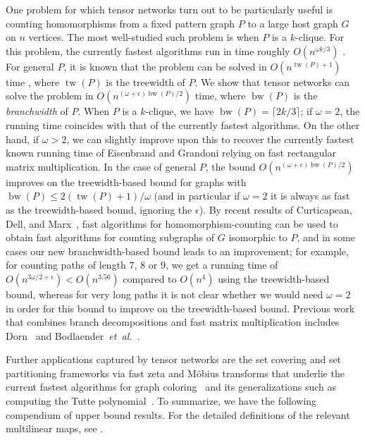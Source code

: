 \documentclass{toc}
\DeclareMathOperator{\bw}{bw}
\DeclareMathOperator{\tw}{tw}
\begin{document}
One problem for which tensor networks turn out to be particularly useful
is counting homomorphisms from a fixed pattern graph $P$ to
a large host graph $G$ on $n$ vertices.  The most well-studied such problem
is when $P$ is a $k$-clique.  For this problem, the currently fastest
algorithms run in time roughly $O(n^{\omega k/3})$
\cite{Nesetril1985,EisenbrandG2004}.  For general $P$, it is known
that the problem can be solved in $O(n^{\tw(P)+1})$ time
\cite{DiazST02}, where $\tw(P)$ is the treewidth of $P$.
We show that tensor networks can solve the problem in $O(n^{(\omega+\epsilon)
  \bw(P)/2})$ time, where $\bw(P)$ is the \emph{branchwidth} of $P$.
When $P$ is a $k$-clique, we have $\bw(P) = \lceil 2k/3\rceil$; if $\omega = 2$,
the running time coincides with that of the currently fastest algorithms.
On the other hand, if $\omega > 2$, we can slightly improve upon this to recover the
currently fastest known running time of
Eisenbrand and Grandoni \cite{EisenbrandG2004} relying on fast rectangular matrix multiplication.
In the case of general $P$, the bound $O(n^{(\omega+\epsilon) \bw(P)/2})$ improves
on the treewidth-based bound for graphs with $\bw(P) \le
2(\tw(P)+1)/\omega$ (and in particular if $\omega=2$ it is always as
fast as the treewidth-based bound, ignoring the $\epsilon$).  By
recent results of Curticapean, Dell, and Marx~\cite{CurticapeanDM2017},
fast algorithms for homomorphism-counting can be used to obtain fast
algorithms for counting subgraphs of $G$ isomorphic to $P$, and in
some cases our new branchwidth-based bound leads to an improvement;
for example, for counting paths %
of length $7$, $8$ or $9$,
we get a running time of $O(n^{3\omega/2+\epsilon}) < O(n^{3.56})$
compared to $O(n^{4})$ using the treewidth-based bound, whereas for very long
paths it is not clear whether we would need $\omega=2$ in order for
%
this bound %
to improve on the treewidth-based bound. Previous work
that combines branch decompositions and fast matrix
multiplication includes Dorn~\cite{Dorn2006} and
Bodlaender~\emph{et~al.}~\cite{BodlaenderLRV2010}.

Further applications
captured by tensor networks are the set covering and set partitioning
frameworks via fast zeta and M\"obius transforms that underlie the
current fastest algorithms for graph coloring~\cite{BjorklundHK2009}
and its generalizations such as computing the
Tutte polynomial~\cite{BjorklundHKK2007,BjorklundHKK2008}.
To summarize, we have the following compendium
%
of upper bound results.
For the detailed definitions of the relevant multilinear maps,
%
%
see  . %
\end{document}
